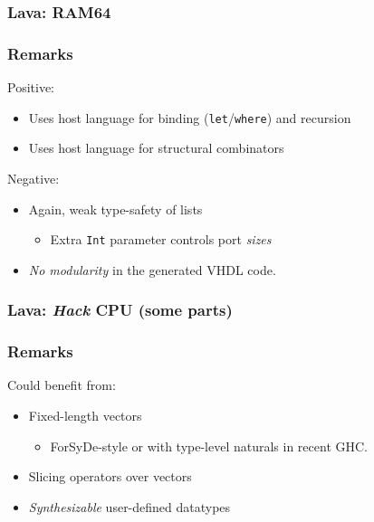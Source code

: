 \documentclass{beamer}
\begin{document}
            \begin{frame}
                \frametitle{Lava: RAM64}
            \end{frame}

            \begin{frame}
                \frametitle{Remarks}

                \par{Positive:}
                \begin{itemize}
                    \item Uses host language for binding (\texttt{let}/\texttt{where}) and recursion
                    \item Uses host language for structural combinators
                \end{itemize}

                \par{Negative:}
                \begin{itemize}
                    \item Again, weak type-safety of lists
                        \begin{itemize}
                            \item Extra \texttt{Int} parameter controls port \emph{sizes}
                        \end{itemize}
                    \item \emph{No modularity} in the generated VHDL code.
                \end{itemize}
            \end{frame}

            \begin{frame}
                \frametitle{Lava: \emph{Hack} CPU (some parts)}
            \end{frame}

            \begin{frame}
                \frametitle{Remarks}

                \par{Could benefit from:}
                \begin{itemize}
                    \item Fixed-length vectors
                        \begin{itemize}
                            \item ForSyDe-style or with type-level naturals in recent GHC.
                        \end{itemize}
                    \item Slicing operators over vectors
                    \item \emph{Synthesizable} user-defined datatypes
                \end{itemize}
            \end{frame}
\end{document}
